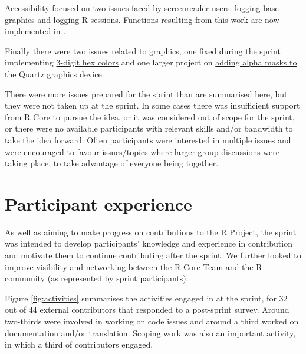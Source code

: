 Accessibility focused on two issues faced by screenreader users: logging base
graphics and logging R sessions. Functions resulting from this work are now
implemented in .

Finally there were two issues related to graphics, one fixed during the sprint
implementing \href{https://github.com/r-devel/r-project-sprint-2023/issues/74}{3-digit hex colors} and one
larger project on \href{https://github.com/r-devel/r-project-sprint-2023/issues/43}{adding alpha masks to the Quartz graphics device}.

There were more issues prepared for the sprint than are summarised here, but
they were not taken up at the sprint. In some cases there was insufficient support from R Core to pursue the idea, or it was considered out of scope for the sprint, or there were no available participants with relevant skills and/or bandwidth to take the idea forward. Often participants were interested in multiple issues and were encouraged to favour issues/topics where larger group discussions were taking
place, to take advantage of everyone being together.

\hypertarget{participant-experience}{%
\section{Participant experience}\label{participant-experience}}

As well as aiming to make progress on contributions to the R Project, the
sprint was intended to develop participants' knowledge and experience in
contribution and motivate them to continue contributing after the sprint.
We further looked to improve visibility and networking between
the R Core Team and the R community (as represented by sprint
participants).

Figure \ref{fig:activities} summarises the activities engaged in at the sprint, for 32 out of 44 external contributors that responded to a post-sprint survey.
Around two-thirds were involved in working on code issues and around a third worked on documentation and/or translation. Scoping work was also an important activity, in which a third of contributors engaged.

